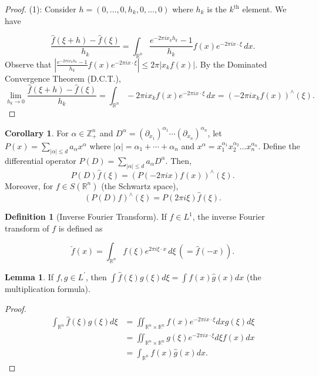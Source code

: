 \documentclass[12pt,openany]{book}
\theoremstyle{definition}
\newtheorem{lemma}[theorem]{Lemma}
\newtheorem{definition}[theorem]{Definition}
\newtheorem{corollary}[theorem]{Corollary}
\begin{document}
\begin{proof}
    (1): Consider $h=(0, \ldots, 0, h_k, 0, \ldots, 0)$ where $h_k$ is the $k^{\text{th}}$ element. We have

$$
\frac{\hat{f}(\xi+h)-\hat{f}(\xi)}{h_k}=\int_{\mathbb{R}^n}\frac{e^{-2 \pi i x_k h_k}-1}{h_k} f(x) e^{-2 \pi i x \cdot \xi} \, dx.
$$
Observe that $\left|\frac{e^{-2 \pi i x_k h_k}-1}{h_k} f(x) e^{-2 \pi i x \cdot \xi}\right| \leqslant 2 \pi |x_k f(x)|$.
By the Dominated Convergence Theorem (D.C.T.),
$$
\lim_{{h_k \to 0}} \frac{\hat{f}(\xi+h)-\hat{f}(\xi)}{h_k}=\int_{\mathbb{R}^n} -2 \pi i x_k f(x) e^{-2 \pi i x \cdot \xi} \, dx = \left(-2 \pi i x_k f(x)\right)^{\wedge}(\xi).
$$
\end{proof}
\begin{corollary}
    For $\alpha \in \mathbb{Z}_+^n$ and $D^\alpha = \left(\partial_{x_1}\right)^{\alpha_1} \cdots \left(\partial_{x_n}\right)^{\alpha_n}$, let $P(x) = \sum_{|\alpha| \leq d} a_\alpha x^\alpha$ where $|\alpha| = \alpha_1 + \cdots + \alpha_n$ and $x^\alpha = x_1^{\alpha_1} x_2^{\alpha_2} \ldots x_n^{\alpha_n}$.
Define the differential operator $P(D) = \sum_{|\alpha| \leqslant d} a_\alpha D^\alpha$. Then,
$$
P(D) \hat{f}(\xi) = (P(-2 \pi i x) f(x))^{\wedge}(\xi).
$$
Moreover, for $f \in S(\mathbb{R}^n)$ (the Schwartz space),
$$
(P(D) f)^{\wedge}(\xi) = P(2 \pi i \xi) \hat{f}(\xi).
$$
\end{corollary}
\begin{definition}[Inverse Fourier Transform]
    If $f \in L^{1}$, the inverse Fourier transform of $f$ is defined as

$$
\check{f}(x) = \int_{\mathbb{R}^n} f(\xi) e^{2 \pi i \xi \cdot x} \, d\xi \, (= \hat{f}(-x)).
$$
\end{definition}
\begin{lemma}
    If $f, g \in L^{\prime}$, then $\int \hat{f}(\xi) g(\xi) d\xi = \int f(x) \hat{g}(x) dx$ (the multiplication formula).
\end{lemma}
\begin{proof}
    $$\begin{aligned}
\int_{\mathbb{R}^n} \hat{f}(\xi) g(\xi) d\xi &= \iint_{{\mathbb{R}^n}\times{\mathbb{R}^n}} f(x) e^{-2 \pi i x \cdot \xi} dx g(\xi) d\xi \\
&= \iint_{{\mathbb{R}^n}\times{\mathbb{R}^n}} g(\xi) e^{-2 \pi i x \cdot \xi} d\xi f(x) dx \\
&= \int_{\mathbb{R}^n} f(x) \hat{g}(x) dx.
\end{aligned}
$$
\end{proof}
\end{document}
